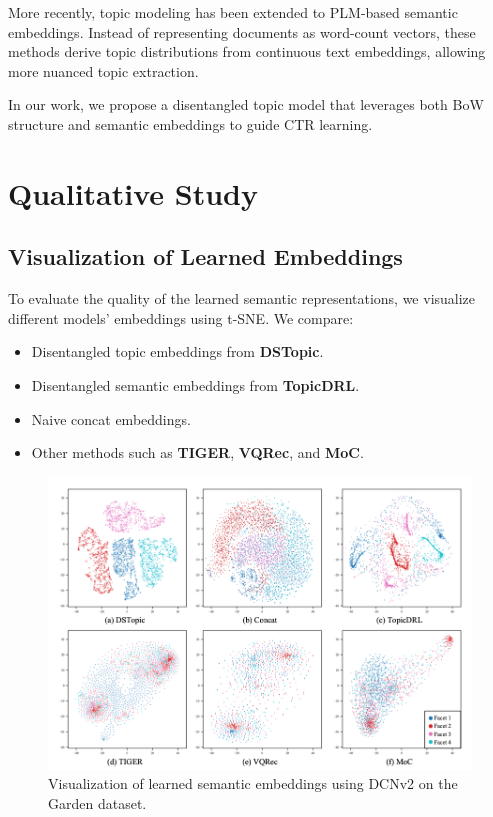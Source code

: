 More recently, topic modeling has been extended to PLM-based semantic embeddings. Instead of representing documents as word-count vectors, these methods derive topic distributions from continuous text embeddings, allowing more nuanced topic extraction.

In our work, we propose a disentangled topic model that leverages both BoW structure and semantic embeddings to guide CTR learning.

\section{Qualitative Study}

\subsection{Visualization of Learned Embeddings}

To evaluate the quality of the learned semantic representations, we visualize different models' embeddings using t-SNE. We compare:
\begin{itemize}
    \item Disentangled topic embeddings from \textbf{DSTopic}.
    \item Disentangled semantic embeddings from \textbf{TopicDRL}.
    \item Naive concat embeddings.
    \item Other methods such as \textbf{TIGER}, \textbf{VQRec}, and \textbf{MoC}.
\end{itemize}

\begin{figure}[htbp]
    \centering
    \includegraphics[width=\textwidth]{Figures/Chapter5/fig3.png}
    \caption{Visualization of learned semantic embeddings using DCNv2 on the Garden dataset.}
    \label{fig:tsne}
\end{figure}

